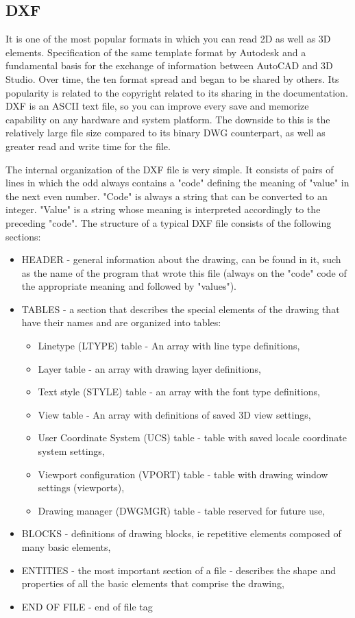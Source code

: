 \documentclass[a4paper, 11pt, article]{report}
\begin{document}
\subsection{DXF}
   
It is one of the most popular formats in which you can read 2D as well as 3D elements. Specification of the same template format by Autodesk and a fundamental basis for the exchange of information between AutoCAD and 3D Studio. Over time, the ten format spread and began to be shared by others. Its popularity is related to the copyright related to its sharing in the documentation. DXF is an ASCII text file, so you can improve every save and memorize capability on any hardware and system platform. The downside to this is the relatively large file size compared to its binary DWG counterpart, as well as greater read and write time for the file.
   
   
The internal organization of the DXF file is very simple. It consists of pairs of lines in which the odd always contains a "code" defining the meaning of "value" in the next even number. "Code" is always a string that can be converted to an integer. "Value" is a string whose meaning is interpreted accordingly to the preceding "code".
The structure of a typical DXF file consists of the following sections:

\begin{itemize}
\item HEADER - general information about the drawing, can be found in it, such as the name of the program that wrote this file (always on the "code" code of the appropriate meaning and followed by "values").
\item TABLES - a section that describes the special elements of the drawing that have their names and are organized into tables:

\begin{itemize}
\item Linetype (LTYPE) table - An array with line type definitions,
\item Layer table - an array with drawing layer definitions,
\item Text style (STYLE) table - an array with the font type definitions,
\item View table - An array with definitions of saved 3D view settings,
\item User Coordinate System (UCS) table - table with saved locale coordinate system settings,
\item Viewport configuration (VPORT) table - table with drawing window settings (viewports),
\item Drawing manager (DWGMGR) table - table reserved for future use,
\end{itemize}

\item BLOCKS - definitions of drawing blocks, ie repetitive elements composed of many basic elements,
\item ENTITIES - the most important section of a file - describes the shape and properties of all the basic elements that comprise the drawing,
\item END OF FILE - end of file tag
\end{itemize}
\end{document}
